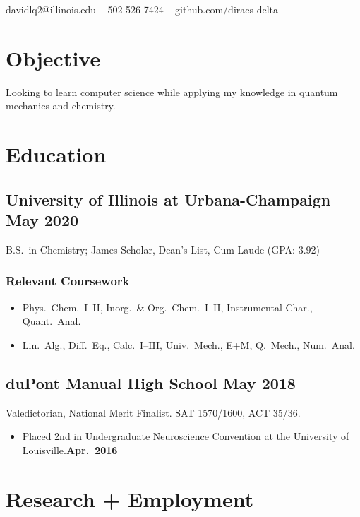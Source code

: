 \documentclass{article}
\makeatletter
\renewcommand{\maketitle}
{
	\begin{center}
	{\huge\bfseries\theauthor}

	\vspace{0.5em}
	davidlq2@illinois.edu -- 502-526-7424 -- github.com/diracs-delta
	\end{center}
}
\makeatother
\begin{document}
\author{David Qiu}
\maketitle

\section{Objective}
Looking to learn computer science while applying my knowledge in quantum
mechanics and chemistry.

\section{Education}

\subsection{University of Illinois at Urbana-Champaign \hfill May 2020}
B.S.\ in Chemistry; James Scholar, Dean's List, Cum Laude (GPA: 3.92)

\subsubsection{Relevant Coursework}

\begin{itemize}[noitemsep,nolistsep]
	\item Phys.\ Chem.\ I--II, Inorg.\ \& Org.\ Chem.\ I--II, Instrumental
		Char., Quant.\ Anal.

	\item Lin.\ Alg., Diff.\ Eq., Calc.\ I--III, Univ.\ Mech., E+M, Q.\
		Mech., Num.\ Anal.
\end{itemize}

\subsection{duPont Manual High School \hfill May 2018}
Valedictorian, National Merit Finalist. SAT 1570/1600, ACT 35/36.

\begin{itemize}[noitemsep,nolistsep]
	\item Placed 2nd in Undergraduate Neuroscience Convention at the University
		of Louisville.\hfill\textbf{Apr.\ 2016}
\end{itemize}

\section{Research + Employment}
\end{document}
